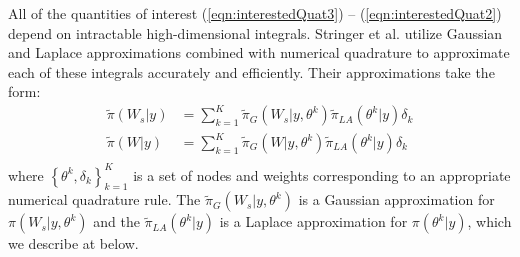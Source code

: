 \documentclass[num-refs,serif,10pt]{wiley-article}
\begin{document}
All of the quantities of interest (\ref{eqn:interestedQuat3}) -- (\ref{eqn:interestedQuat2}) depend on intractable high-dimensional integrals. Stringer et al. \cite{casecross} utilize Gaussian and Laplace approximations combined with numerical quadrature to approximate each of these integrals accurately and efficiently. Their approximations take the form:
\begin{equation}\begin{aligned}\label{eqn:integration}
\tilde{\pi}(W_{s}|y) &= \sum_{k=1}^{K}
\tilde{\pi}_{G}(W_{s}|y,\theta^{k})
\tilde{\pi}_{LA}(\theta^{k}|y)\delta_{k} \\
\tilde{\pi}(W|y) &= \sum_{k=1}^{K}
\tilde{\pi}_{G}(W|y,\theta^{k})
\tilde{\pi}_{LA}(\theta^{k}|y)\delta_{k} \\
\end{aligned}\end{equation}
where $\left\{\theta^{k},\delta_{k}\right\}_{k=1}^{K}$ is a set of nodes and weights corresponding to an appropriate numerical quadrature rule. The $\tilde{\pi}_{G}(W_{s}|y,\theta^{k})$ is a Gaussian approximation for $\pi(W_{s}|y,\theta^{k})$ and the $\tilde{\pi}_{LA}(\theta^{k}|y)$ is a Laplace approximation for $\pi(\theta^{k}|y)$, which we describe at below.
\end{document}
